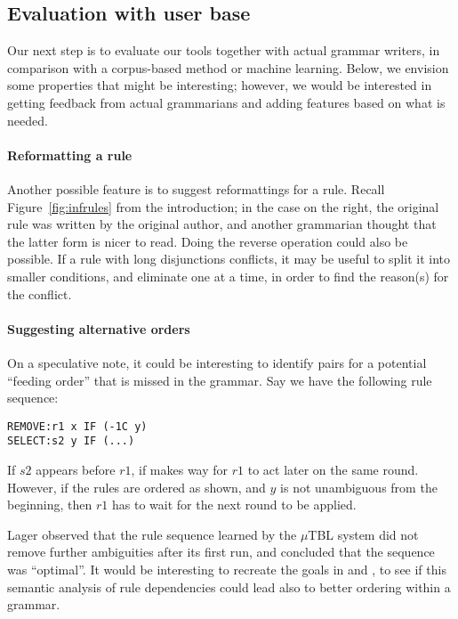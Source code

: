 \subsection{Evaluation with user base}

Our next step is to evaluate our tools together with actual grammar writers,
in comparison with a corpus-based method or machine learning. 
Below, we envision some properties that might be interesting; however, we would be interested in getting feedback from actual grammarians and adding features based on what is needed.

\paragraph{Reformatting a rule}

Another possible feature is to suggest reformattings for a rule. Recall
Figure~\ref{fig:infrules} from the introduction; in the case on the right, the
original rule was written by the original author, and another
grammarian thought that the latter form is nicer to read. Doing the
reverse operation could also be possible. If a rule with long
disjunctions conflicts, it may be useful to split it into smaller
conditions, and eliminate one at a time, in order to find the
reason(s) for the conflict.


\paragraph{Suggesting alternative orders} 
On a speculative note, it could be interesting to identify pairs for a potential ``feeding order'' that is missed in the grammar. Say we have the following rule sequence:

\begin{verbatim}
REMOVE:r1 x IF (-1C y)
SELECT:s2 y IF (...)
\end{verbatim}

If $s2$ appears before $r1$, if makes way for $r1$ to act later on the same round. 
However, if the rules are ordered as shown, and $y$ is not unambiguous from the beginning, then $r1$ has to wait for the next round to be applied.



Lager \cite{lager01transformation} observed that the rule sequence learned by the $\mu$TBL system did not remove further ambiguities after its first run, and concluded that the sequence was ``optimal''. 
It would be interesting to recreate the goals in \cite{lager01transformation} and \cite{bick2013tuning}, to see if this semantic analysis of rule dependencies could lead also to better ordering within a grammar.

